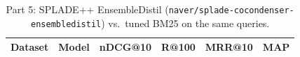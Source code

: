 \begin{table}[ht]\centering\small
\begin{tabular}{llrrrr}\toprule
Dataset & Model & nDCG@10 & R@100 & MRR@10 & MAP \\ \midrule

\bottomrule\end{tabular}
\caption{Part 5: SPLADE++ EnsembleDistil (\texttt{naver/splade-cocondenser-ensembledistil}) vs.\ tuned BM25 on the same queries.}\label{tab:p5}\end{table}
